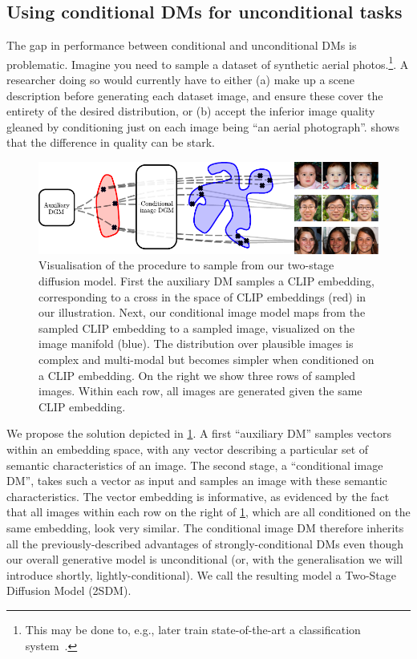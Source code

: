 \subsection{Using conditional DMs for unconditional tasks} \label{sec:2sdm-2sdm-method}

The gap in performance between conditional and unconditional DMs is problematic. Imagine you need to sample a dataset of synthetic aerial photos.\footnote{ This may be done to, e.g., later train state-of-the-art a classification system~\citep{azizi2023synthetic}.}. A researcher doing so would currently have to either (a) make up a scene description before generating each dataset image, and ensure these cover the entirety of the desired distribution, or (b) accept the inferior image quality gleaned by conditioning just on each image being ``an aerial photograph''.   shows that the difference in quality can be stark.

\begin{figure}[t]
    \centering
    \includegraphics[width=\textwidth]{figs/2sdm/vcdm-diagram.pdf}
    \caption{Visualisation of the procedure to sample from our two-stage diffusion model. First the auxiliary DM samples a CLIP embedding, corresponding to a cross in the space of CLIP embeddings (red) in our illustration. Next, our conditional image model maps from the sampled CLIP embedding to a sampled image, visualized on the image manifold (blue). The distribution over plausible images is complex and multi-modal but becomes simpler when conditioned on a CLIP embedding. On the right we show three rows of sampled images. Within each row, all images are generated given the same CLIP embedding.}
    \label{fig:samples}
\end{figure}
We propose the solution depicted in \cref{fig:samples}. A first ``auxiliary DM'' samples vectors within an embedding space, with any vector describing a particular set of semantic characteristics of an image. The second stage, a ``conditional image DM'', takes such a vector as input and samples an image with these semantic characteristics. The vector embedding is informative, as evidenced by the fact that all images within each row on the right of \cref{fig:samples}, which are all conditioned on the same embedding, look very similar. The conditional image DM therefore inherits all the previously-described advantages of strongly-conditional DMs even though our overall generative model is unconditional (or, with the generalisation we will introduce shortly, lightly-conditional). We call the resulting model a Two-Stage Diffusion Model (2SDM).

